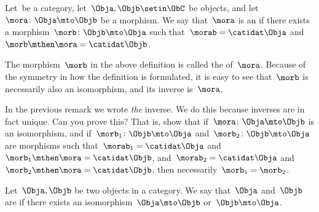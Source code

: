 {%

\begin{ctdefinition}[Isomorphism]
    Let~\CatC be a category, let~$\Obja,\Objb \setin \ObC$ be objects, and let~$\mora \colon \Obja \mto \Objb$ be a morphism.
    We say that~$\mora$ is an  if there exists a morphism~$\morb\colon \Objb \mto \Obja$ such that~$\morab = \catidat\Obja$ and~$\morb \mthen \mora = \catidat\Objb$.
\end{ctdefinition}

\begin{remark}
    \label{rem:inverse}
    The morphism~$\morb$ in the above definition is called the \textbf{} of~$\mora$.
    Because of the symmetry in how the definition is formulated, it is easy to see that~$\morb$ is necessarily also an isomorphism, and its inverse is~$\mora$.
\end{remark}

\begin{exercise}
    \label{ex:isoinverse}
    In the previous remark we wrote \emph{the} inverse.
    We do this because inverses are in fact unique.
    Can you prove this?
    That is, show that if~$\mora \colon \Obja \mto \Objb$ is an isomorphism, and if~$\morb_1\colon \Objb \mto \Obja$ and~$\morb_2\colon \Objb \mto \Obja$ are morphisms such that~$\morab_1 = \catidat\Obja$ and~$\morb_1 \mthen \mora = \catidat\Objb$, and~$\morab_2 = \catidat\Obja$ and~$\morb_2 \mthen \mora = \catidat\Objb$, then necessarily~$\morb_1 = \morb_2$.
\end{exercise}
\begin{solution}
    \missingsolution

\end{solution}

\begin{ctdefinition}\label{def:isomorphic-objects}
    Let~$\Obja,\Objb$ be two objects in a category.
    We say that~$\Obja$ and~$\Objb$ are  if there exists an isomorphism~$\Obja \mto \Objb$ or~$\Objb \mto \Obja$.
\end{ctdefinition}

}
